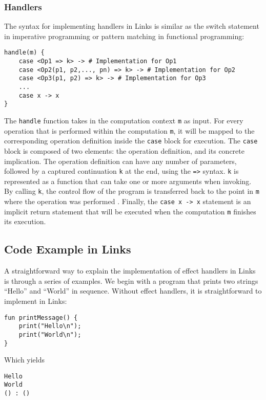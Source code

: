 \documentclass[logo,bsc,singlespacing,parskip]{infthesis}
\begin{document}
\subsubsection{Handlers}
\label{section:handler}

The syntax for implementing handlers in Links is similar as the switch statement in imperative programming or pattern matching in functional programming:
\begin{verbatim}
handle(m) {
    case <Op1 => k> -> # Implementation for Op1
    case <Op2(p1, p2,..., pn) => k> -> # Implementation for Op2
    case <Op3(p1, p2) => k> -> # Implementation for Op3
    ...
    case x -> x
}
\end{verbatim}
The \texttt{handle} function takes in the computation context \texttt{m} as input. For every operation that is performed within the computation \texttt{m}, it will be mapped to the corresponding operation definition inside the \texttt{case} block for execution. The \texttt{case} block is composed of two elements: the operation definition, and its concrete implication. The operation definition can have any number of parameters, followed by a captured continuation \texttt{k} at the end, using the \texttt{=>} syntax. \texttt{k} is represented as a function that can take one or more arguments when invoking. By calling \texttt{k}, the control flow of the program is transferred back to the point in \texttt{m} where the operation was performed \cite{daniel_effect_links}. Finally, the \texttt{case x -> x} statement is an implicit return statement that will be executed when the computation \texttt{m} finishes its execution.

\subsection{Code Example in Links}

A straightforward way to explain the implementation of effect handlers in Links is through a series of examples. We begin with a program that prints two strings ``Hello'' and ``World'' in sequence. Without effect handlers, it is straightforward to implement in Links:
\begin{verbatim}
fun printMessage() {
    print("Hello\n");
    print("World\n");
}
\end{verbatim}

Which yields

\begin{verbatim}
Hello
World
() : ()
\end{verbatim}
\end{document}
